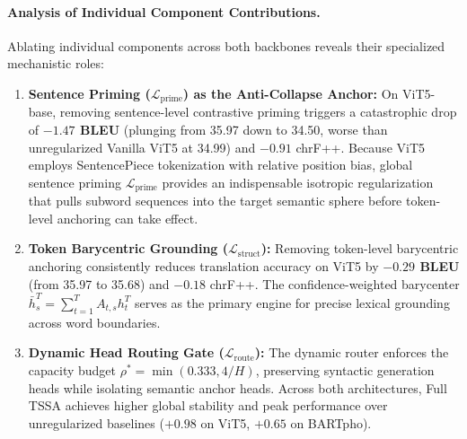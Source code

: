 \documentclass[11pt]{article}
\begin{document}
\paragraph{Analysis of Individual Component Contributions.}
Ablating individual components across both backbones reveals their specialized mechanistic roles:
\begin{enumerate}[leftmargin=*]
    \item \textbf{Sentence Priming ($\mathcal{L}_{\text{prime}}$) as the Anti-Collapse Anchor:} On ViT5-base, removing sentence-level contrastive priming triggers a catastrophic drop of \textbf{$-1.47$ BLEU} (plunging from 35.97 down to 34.50, worse than unregularized Vanilla ViT5 at 34.99) and $-0.91$ chrF++. Because ViT5 employs SentencePiece tokenization with relative position bias, global sentence priming $\mathcal{L}_{\text{prime}}$ provides an indispensable isotropic regularization that pulls subword sequences into the target semantic sphere before token-level anchoring can take effect.
    \item \textbf{Token Barycentric Grounding ($\mathcal{L}_{\text{struct}}$):} Removing token-level barycentric anchoring consistently reduces translation accuracy on ViT5 by \textbf{$-0.29$ BLEU} (from 35.97 to 35.68) and $-0.18$ chrF++. The confidence-weighted barycenter $\bar{h}_s^T = \sum_{t=1}^T A_{t,s} h_t^T$ serves as the primary engine for precise lexical grounding across word boundaries.
    \item \textbf{Dynamic Head Routing Gate ($\mathcal{L}_{\text{route}}$):} The dynamic router enforces the capacity budget $\rho^* = \min(0.333, 4/H)$, preserving syntactic generation heads while isolating semantic anchor heads. Across both architectures, Full TSSA achieves higher global stability and peak performance over unregularized baselines ($+0.98$ on ViT5, $+0.65$ on BARTpho).
\end{enumerate}
\end{document}
